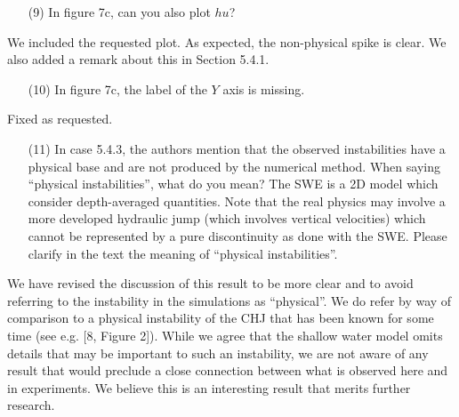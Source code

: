 \documentclass[english,11pt]{article}
\begin{document}
\bigskip
{\color{OliveGreen}
  \begin{itemize}
  \item[(9)]
    In figure 7c, can you also plot $hu$?
  \end{itemize}
}
\noindent
We included the requested plot. As expected, the non-physical spike is clear.
We also added a remark about this in Section 5.4.1.

\bigskip
{\color{OliveGreen}
  \begin{itemize}
  \item[(10)]
    In figure 7c, the label of the $Y$ axis is missing.
  \end{itemize}
}
\noindent
Fixed as requested.

\bigskip
{\color{OliveGreen}
  \begin{itemize}
  \item[(11)]
    In case 5.4.3, the authors mention that the observed instabilities have a physical base and are not 
    produced by the numerical method. When saying ``physical instabilities'', what do you mean? 
    The SWE is a 2D model which consider depth-averaged quantities. Note that the real physics may involve 
    a more developed hydraulic jump (which involves vertical velocities) which cannot be represented by a 
    pure discontinuity as done with the SWE. Please clarify in the text the meaning of ``physical instabilities''.
  \end{itemize}
}
\noindent
We have revised the discussion of this result to be more clear and to avoid
referring to the instability in the simulations as ``physical''.  We do refer by
way of comparison to a physical instability of the CHJ that has been known for
some time
(see e.g. [8, Figure 2]).  While we agree that the shallow water model omits
details that may be important to such an instability, we are not aware of any result that
would preclude a close connection between what is observed here and in experiments.
We believe this is an interesting result that merits further research.



\end{document}
